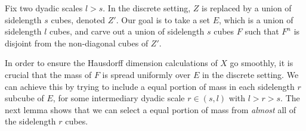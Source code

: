 \documentclass[usenames,dvipsnames]{article}
\theoremstyle{plain}
\theoremstyle{plain}
\begin{document}
Fix two dyadic scales $l > s$. In the discrete setting, $Z$ is replaced by a union of sidelength $s$ cubes, denoted $Z'$. Our goal is to take a set $E$, which is a union of sidelength $l$ cubes, and carve out a union of sidelength $s$ cubes $F$ such that $F^n$ is disjoint from the non-diagonal cubes of $Z'$.

In order to ensure the Hausdorff dimension calculations of $X$ go smoothly, it is crucial that the mass of $F$ is spread uniformly over $E$ in the discrete setting. We can achieve this by trying to include a equal portion of mass in each sidelength $r$ subcube of $E$, for some intermediary dyadic scale $r \in (s,l)$ with $l > r > s$. The next lemma shows that we can select a equal portion of mass from {\it almost} all of the sidelength $r$ cubes.

\begin{figure}[h]
	\centering
\end{figure}
\end{document}
